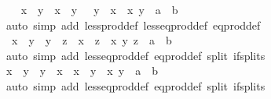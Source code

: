 \begin{isabellebody}
\ \ \isamarkupfalse%
\ {\isachardoublequoteopen}{\isacharparenleft}{\kern0pt}x\ {\isacharless}{\kern0pt}\ y{\isacharparenright}{\kern0pt}\ {\isacharequal}{\kern0pt}\ {\isacharparenleft}{\kern0pt}x\ {\isasymle}\ y\ {\isasymand}\ {\isasymnot}\ y\ {\isasymle}\ x{\isacharparenright}{\kern0pt}{\isachardoublequoteclose}\ \ x\ y\ {\isacharcolon}{\kern0pt}{\isacharcolon}{\kern0pt}\ {\isachardoublequoteopen}{\isacharprime}{\kern0pt}a\ {\isasymtimes}\ {\isacharprime}{\kern0pt}b{\isachardoublequoteclose}\isanewline
\ \ \ \ \isamarkupfalse%
\ {\isacharparenleft}{\kern0pt}auto\ simp\ add{\isacharcolon}{\kern0pt}\ less{\isacharunderscore}{\kern0pt}prod{\isacharunderscore}{\kern0pt}def\ less{\isacharunderscore}{\kern0pt}eq{\isacharunderscore}{\kern0pt}prod{\isacharunderscore}{\kern0pt}def\ eq{\isacharunderscore}{\kern0pt}prod{\isacharunderscore}{\kern0pt}def{\isacharparenright}{\kern0pt}\isanewline
\ \ \isamarkupfalse%
\ {\isachardoublequoteopen}\ x\ {\isasymle}\ y\ {\isasymLongrightarrow}\ y\ {\isasymle}\ z\ {\isasymLongrightarrow}\ x\ {\isasymle}\ z{\isachardoublequoteclose}\ \ x\ y\ z\ {\isacharcolon}{\kern0pt}{\isacharcolon}{\kern0pt}\ {\isachardoublequoteopen}{\isacharprime}{\kern0pt}a\ {\isasymtimes}\ {\isacharprime}{\kern0pt}b{\isachardoublequoteclose}\isanewline
\ \ \ \ \isamarkupfalse%
\ {\isacharparenleft}{\kern0pt}auto\ simp\ add{\isacharcolon}{\kern0pt}\ less{\isacharunderscore}{\kern0pt}eq{\isacharunderscore}{\kern0pt}prod{\isacharunderscore}{\kern0pt}def\ eq{\isacharunderscore}{\kern0pt}prod{\isacharunderscore}{\kern0pt}def\ split{\isacharcolon}{\kern0pt}\ if{\isacharunderscore}{\kern0pt}splits{\isacharparenright}{\kern0pt}\isanewline
\ \ \isamarkupfalse%
\ {\isachardoublequoteopen}x\ {\isasymle}\ y\ {\isasymLongrightarrow}\ y\ {\isasymle}\ x\ {\isasymLongrightarrow}\ x\ {\isacharequal}{\kern0pt}\ y{\isachardoublequoteclose}\ \ x\ y\ {\isacharcolon}{\kern0pt}{\isacharcolon}{\kern0pt}\ {\isachardoublequoteopen}{\isacharprime}{\kern0pt}a\ {\isasymtimes}\ {\isacharprime}{\kern0pt}b{\isachardoublequoteclose}\isanewline
\ \ \ \ \isamarkupfalse%
\ {\isacharparenleft}{\kern0pt}auto\ simp\ add{\isacharcolon}{\kern0pt}\ less{\isacharunderscore}{\kern0pt}eq{\isacharunderscore}{\kern0pt}prod{\isacharunderscore}{\kern0pt}def\ eq{\isacharunderscore}{\kern0pt}prod{\isacharunderscore}{\kern0pt}def\ split{\isacharcolon}{\kern0pt}\ if{\isacharunderscore}{\kern0pt}splits{\isacharparenright}{\kern0pt}\isanewline
\ \ \isamarkupfalse%

\end{isabellebody}
